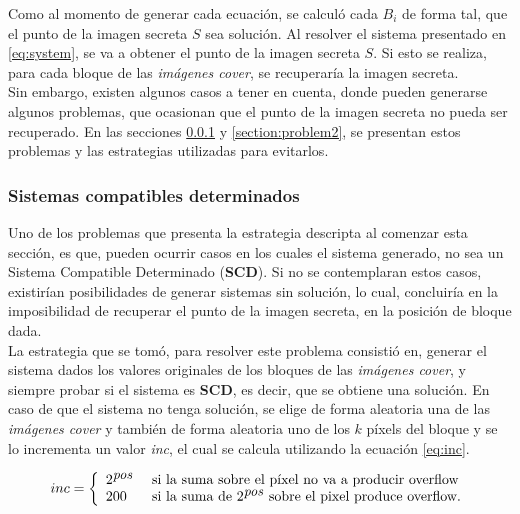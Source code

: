 \documentclass{article}
\begin{document}
Como al momento de generar cada ecuación, se calculó cada $B_i$ de forma tal, que el punto de la imagen secreta $S$ sea solución.
Al resolver el sistema presentado en \ref{eq:system}, se va a obtener el punto de la imagen secreta $S$. Si esto se realiza, para
cada bloque de las \emph{imágenes cover}, se recuperaría la imagen secreta.\\

Sin embargo, existen algunos casos a tener en cuenta, donde pueden generarse algunos problemas, que ocasionan que el punto de la
imagen secreta no pueda ser recuperado. En las secciones \ref{section:problem1} y \ref{section:problem2}, se presentan estos problemas
y las estrategias utilizadas para evitarlos.

\subsubsection{Sistemas compatibles determinados}
\label{section:problem1}

Uno de los problemas que presenta la estrategia descripta al comenzar esta sección, es que, pueden ocurrir casos en los cuales el sistema
generado, no sea un Sistema Compatible Determinado (\textbf{SCD}). Si no se contemplaran estos casos, existirían posibilidades de generar
sistemas sin solución, lo cual, concluiría en la imposibilidad de recuperar el punto de la imagen secreta, en la posición de bloque dada. \\

La estrategia que se tomó, para resolver este problema consistió en, generar el sistema dados los valores originales de los bloques de las 
\emph{imágenes cover}, y siempre probar si el sistema es \textbf{SCD}, es decir, que se obtiene una solución. En caso de que el sistema
no tenga solución, se elige de forma aleatoria una de las \emph{imágenes cover} y también de forma aleatoria uno de los $k$ píxels del bloque
y se lo incrementa un valor \emph{inc}, el cual se calcula utilizando la ecuación \ref{eq:inc}.

\begin{equation}
 \label{eq:inc}
 inc =
  \left\{ 
  \begin{array}{l l}
  2^{\mbox{\emph{pos}}} & \mbox{ si la suma sobre el píxel no va a producir overflow}\\
  200 & \mbox{ si la suma de } 2^{\mbox{\emph{pos}}} \mbox{ sobre el pixel produce overflow}. \\
  \end{array} \right.
\end{equation}
\end{document}

